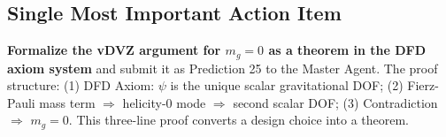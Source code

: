 \documentclass[11pt]{article}
\begin{document}
\subsection{Single Most Important Action Item}

\textbf{Formalize the vDVZ argument for $m_g = 0$ as a theorem in
the DFD axiom system} and submit it as Prediction 25 to the Master
Agent.  The proof structure: (1) DFD Axiom: $\psi$ is the unique
scalar gravitational DOF; (2) Fierz-Pauli mass term $\Rightarrow$
helicity-0 mode $\Rightarrow$ second scalar DOF; (3) Contradiction
$\Rightarrow$ $m_g = 0$.  This three-line proof converts a design
choice into a theorem.
\end{document}
